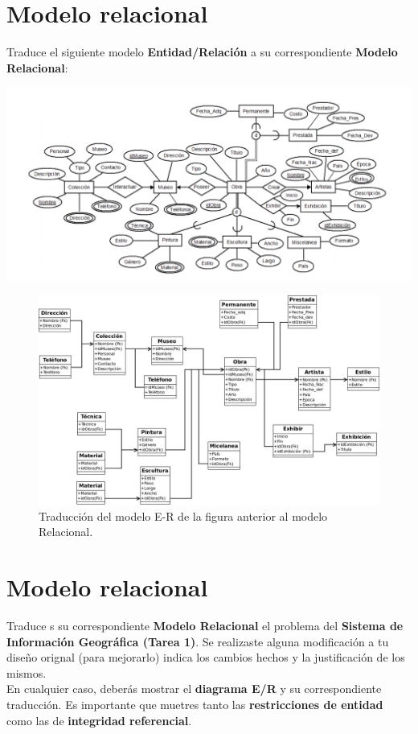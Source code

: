 \documentclass{article}
\begin{document}
    \section{Modelo relacional}
    Traduce el siguiente modelo \textbf{Entidad/Relación} a su correspondiente 
    \textbf{Modelo Relacional}:
    
    \begin{center}
        \includegraphics[width=1\textwidth]{er1.png}
    \end{center}

    \begin{figure}[H]
    	\begin{center}
    		\includegraphics[width=1\textwidth]{MRProblema2.jpeg}
    	\end{center}
    	\caption{Traducción del modelo E-R de la figura anterior al modelo Relacional.}
    \end{figure}
        
    \section{Modelo relacional}
    Traduce s su correspondiente \textbf{Modelo Relacional} el problema del 
    \textbf{Sistema de Información Geográfica (Tarea 1)}. Se realizaste alguna
    modificación a tu diseño orignal (para mejorarlo) indica los cambios hechos 
    y la justificación de los mismos.\\
    En cualquier caso, deberás mostrar el \textbf{diagrama E/R} y su
    correspondiente traducción. Es importante que muetres tanto las 
    \textbf{restricciones de entidad} como las de \textbf{integridad referencial}.
    
\end{document}
